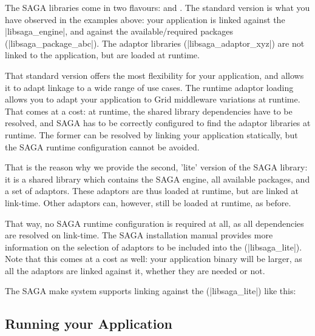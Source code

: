  The SAGA libraries come in two flavours:  and .
 The standard version is what you have observed in the examples
 above: your application is linked against the |libsaga_engine|, and
 against the available/required packages (|libsaga_package_abc|).  The
 adaptor libraries (|libsaga_adaptor_xyz|) are not linked to the
 application, but are loaded at runtime.  
 
 That standard version offers the most flexibility for your
 application, and allows it to adapt linkage to a wide range of use
 cases.  The runtime adaptor loading allows you to adapt your application
 to Grid middleware variations at runtime. That comes at a cost: at
 runtime, the shared library dependencies have to be resolved, and
 SAGA has to be correctly configured to find the adaptor libraries at
 runtime.  The former can be resolved by linking your application
 statically, but the SAGA runtime configuration cannot be avoided.

 That is the reason why we provide the second, 'lite' version of the
 SAGA library: it is a  shared library which contains the
 SAGA engine, all available packages, and a set of adaptors.  These
 adaptors are thus  loaded at runtime, but are linked at
 link-time.  Other adaptors can, however, still be loaded at runtime,
 as before.
 
 That way, no SAGA runtime configuration is required at all, as all
 dependencies are resolved on link-time.  The SAGA installation manual
 provides more information on the selection of adaptors to be included
 into the (|libsaga_lite|).  Note that this comes at a cost as well:
 your application binary will be larger, as all the adaptors are linked
 against it, whether they are needed or not.

 The SAGA make system supports linking against the (|libsaga_lite|)
 like this:



\subsection{Running your Application}

